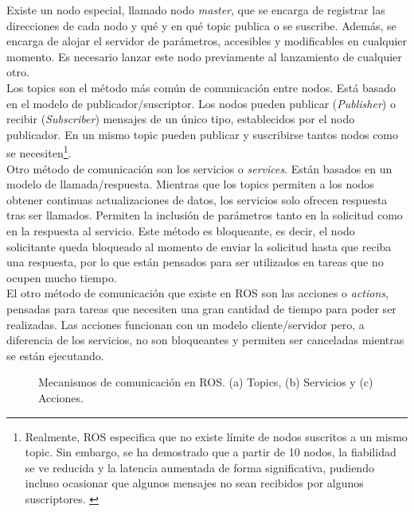 Existe un nodo especial, llamado nodo \textit{master}, que se encarga de registrar las direcciones de cada nodo y qué y en qué topic publica o se suscribe. Además, se encarga de alojar el servidor de parámetros, accesibles y modificables en cualquier momento. Es necesario lanzar este nodo previamente al lanzamiento de cualquier otro. \\

Los topics son el método más común de comunicación entre nodos. Está basado en el modelo de publicador/suscriptor. Los nodos pueden publicar (\textit{Publisher}) o recibir (\textit{Subscriber}) mensajes de un único tipo, establecidos por el nodo publicador. En un mismo topic pueden publicar y suscribirse tantos nodos como se necesiten\footnote{Realmente, ROS especifica que no existe límite de nodos suscritos a un mismo topic. Sin embargo, se ha demostrado que a partir de 10 nodos, la fiabilidad se ve reducida y la latencia aumentada de forma significativa, pudiendo incluso ocasionar que algunos mensajes no sean recibidos por algunos suscriptores. \cite{issue}}. \\

Otro método de comunicación son los servicios o \textit{services}. Están basados en un modelo de llamada/respuesta. Mientras que los topics permiten a los nodos obtener continuas actualizaciones de datos, los servicios solo ofrecen respuesta tras ser llamados. Permiten la inclusión de parámetros tanto en la solicitud como en la respuesta al servicio. Este método es bloqueante, es decir, el nodo solicitante queda bloqueado al momento de enviar la solicitud hasta que reciba una respuesta, por lo que están pensados para ser utilizados en tareas que no ocupen mucho tiempo.\\

El otro método de comunicación que existe en ROS son las acciones o \textit{actions}, pensadas para tareas que necesiten una gran cantidad de tiempo para poder ser realizadas. Las acciones funcionan con un modelo cliente/servidor pero, a diferencia de los servicios, no son bloqueantes y permiten ser canceladas mientras se están ejecutando.\\

\begin{figure}[H]
 \centering
  \hspace{0.5cm}
 \caption{Mecanismos de comunicación en ROS. (a) Topics, (b) Servicios y (c) Acciones. \cite{roswiki}}
 \label{fig:comm}
\end{figure}

